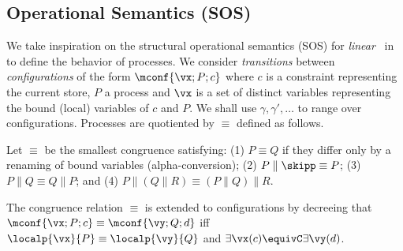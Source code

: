 \documentclass{tlp}
\begin{document}
\subsection{Operational Semantics (SOS)}\label{sec:opersem}
We take inspiration on the structural operational semantics (SOS)  for {\em linear} \ccp\ in \cite{DBLP:journals/iandc/FagesRS01,DBLP:conf/fsttcs/HaemmerleFS07} to 
define the behavior of processes.  We consider \emph{transitions}  between \emph{configurations} of the form  \( \mconf{\vx;P ; c}  \) 
where $c$ is a constraint representing the current store, $P$ a process and $\vx$ is a set of distinct variables representing the  bound
(local) variables of $c$ and $P$.
  We shall use $\gamma,\gamma',\ldots$ to range over configurations.  Processes 
 are  quotiented by $\equiv$ defined as follows. 
\begin{definition}\label{struct} Let \( \equiv  \)
be the smallest congruence  satisfying:  
(1)  \( P \equiv Q \) if they differ only by a renaming of bound variables (alpha-conversion); (2)  \( P \parallel \skipp \equiv P \); (3)  \( P \parallel Q \equiv Q \parallel P \); and  (4)  \( P \parallel (Q \parallel R) \equiv (P \parallel Q) \parallel R \).
\end{definition}
The congruence relation $\equiv$ is extended to configurations by decreeing that $\mconf{\vx;P;c} \equiv \mconf{\vy;Q;d}$ iff 
  $\localp{\vx}{P} \equiv \localp{\vy}{Q}$ and $\exists \vx(c) \equivC \exists \vy(d)$. 
\end{document}
